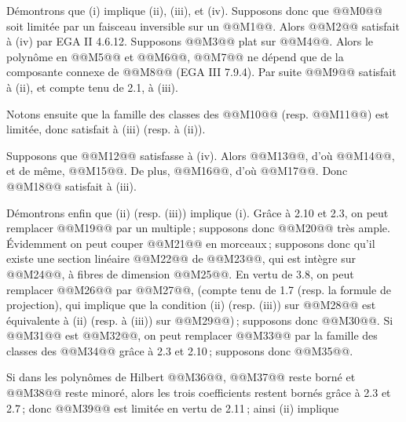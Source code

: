 
D\'
emontrons que (i) implique (ii), (iii), et (iv). Supposons donc que @@M0@@ soit limit\'ee par un faisceau inversible sur un @@M1@@. Alors @@M2@@ satisfait \`a (iv) par EGA II 4.6.12. Supposons @@M3@@ plat sur @@M4@@. Alors le polyn\^ome en @@M5@@ et @@M6@@, @@M7@@ ne d\'epend que de la composante connexe de @@M8@@ (EGA III 7.9.4). Par suite @@M9@@ satisfait \`a (ii), et compte tenu de 2.1, \`a (iii).

Notons ensuite que la famille des classes des @@M10@@ (resp. @@M11@@) est limit\'ee, donc satisfait \`a (iii) (resp. \`a (ii)).

Supposons que @@M12@@ satisfasse \`a (iv). Alors @@M13@@, d'o\`u @@M14@@, et de m\^eme, @@M15@@. De plus, @@M16@@, d'o\`u @@M17@@. Donc @@M18@@ satisfait \`a (iii).

D\'emontrons enfin que (ii) (resp. (iii)) implique (i). Gr\^ace \`a 2.10 et 2.3, on peut remplacer @@M19@@ par un multiple\,; supposons donc @@M20@@ tr\`es ample. \'Evidemment on peut couper @@M21@@ en morceaux\,; supposons donc qu'il existe une section lin\'eaire @@M22@@ de @@M23@@, qui est int\`egre sur @@M24@@, \`a fibres de dimension @@M25@@. En vertu de 3.8, on peut remplacer @@M26@@ par @@M27@@, (compte tenu de 1.7 (resp. la formule de projection), qui implique que la condition (ii) (resp. (iii)) sur @@M28@@ est \'equivalente \`a (ii) (resp. \`a (iii)) sur @@M29@@)\,; supposons donc @@M30@@. Si @@M31@@ est @@M32@@, on peut remplacer @@M33@@ par la famille des classes des @@M34@@ gr\^ace \`a 2.3 et 2.10\,; supposons donc @@M35@@.

Si dans les polyn\^omes de Hilbert @@M36@@, @@M37@@ reste born\'e et @@M38@@ reste minor\'e, alors les trois coefficients restent born\'es gr\^ace \`a 2.3 et 2.7\,; donc @@M39@@ est limit\'ee en vertu de 2.11\,; ainsi (ii) implique
